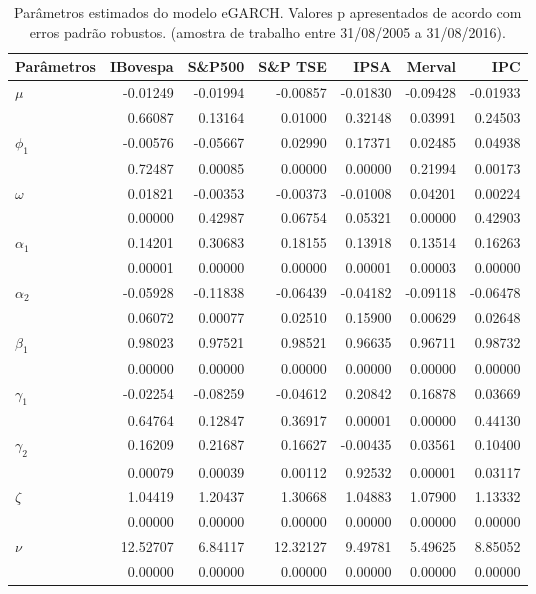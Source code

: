 \begin{table}[H]
\centering
\caption{Par\^ametros estimados do modelo eGARCH. Valores p apresentados 
               de acordo com erros padrão robustos. (amostra de trabalho entre 31/08/2005 a 31/08/2016).} 
\label{tab:garchcoef}
\begin{tabular}{lrrrrrr}
  \hline
Parâmetros & IBovespa & S\&P500 & S\&P TSE & IPSA & Merval & IPC \\ 
  \hline
$\mu$ & -0.01249 & -0.01994 & -0.00857 & -0.01830 & -0.09428 & -0.01933 \\ 
   & 0.66087 & 0.13164 & 0.01000 & 0.32148 & 0.03991 & 0.24503 \\ 
  $\phi_1$ & -0.00576 & -0.05667 & 0.02990 & 0.17371 & 0.02485 & 0.04938 \\ 
   & 0.72487 & 0.00085 & 0.00000 & 0.00000 & 0.21994 & 0.00173 \\ 
  $\omega$ & 0.01821 & -0.00353 & -0.00373 & -0.01008 & 0.04201 & 0.00224 \\ 
   & 0.00000 & 0.42987 & 0.06754 & 0.05321 & 0.00000 & 0.42903 \\ 
  $\alpha_1$ & 0.14201 & 0.30683 & 0.18155 & 0.13918 & 0.13514 & 0.16263 \\ 
   & 0.00001 & 0.00000 & 0.00000 & 0.00001 & 0.00003 & 0.00000 \\ 
  $\alpha_2$ & -0.05928 & -0.11838 & -0.06439 & -0.04182 & -0.09118 & -0.06478 \\ 
   & 0.06072 & 0.00077 & 0.02510 & 0.15900 & 0.00629 & 0.02648 \\ 
  $\beta_1$ & 0.98023 & 0.97521 & 0.98521 & 0.96635 & 0.96711 & 0.98732 \\ 
   & 0.00000 & 0.00000 & 0.00000 & 0.00000 & 0.00000 & 0.00000 \\ 
  $\gamma_1$ & -0.02254 & -0.08259 & -0.04612 & 0.20842 & 0.16878 & 0.03669 \\ 
   & 0.64764 & 0.12847 & 0.36917 & 0.00001 & 0.00000 & 0.44130 \\ 
  $\gamma_2$ & 0.16209 & 0.21687 & 0.16627 & -0.00435 & 0.03561 & 0.10400 \\ 
   & 0.00079 & 0.00039 & 0.00112 & 0.92532 & 0.00001 & 0.03117 \\ 
  $\zeta$ & 1.04419 & 1.20437 & 1.30668 & 1.04883 & 1.07900 & 1.13332 \\ 
   & 0.00000 & 0.00000 & 0.00000 & 0.00000 & 0.00000 & 0.00000 \\ 
  $\nu$ & 12.52707 & 6.84117 & 12.32127 & 9.49781 & 5.49625 & 8.85052 \\ 
   & 0.00000 & 0.00000 & 0.00000 & 0.00000 & 0.00000 & 0.00000 \\ 
   \hline
\end{tabular}
\end{table}
